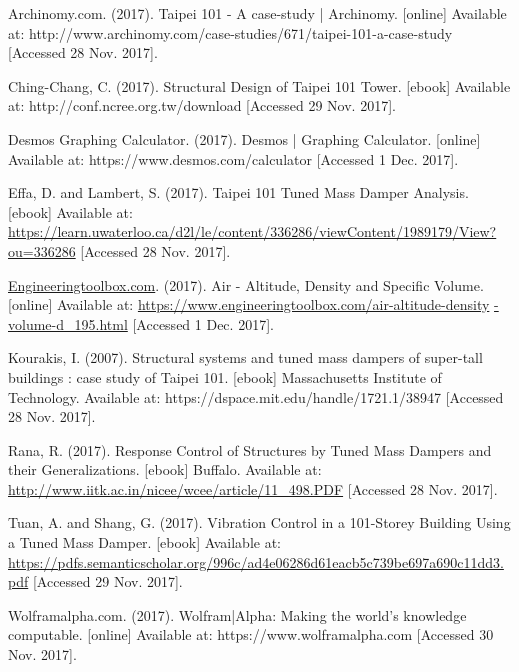 \documentclass[12pt,twoside,letterpaper]{article}
\begin{document}
\begin{list}{}{%
\setlength{\topsep}{0pt}%
\setlength{\leftmargin}{0.3in}%
\setlength{\listparindent}{-0.3in}%
\setlength{\itemindent}{-0.3in}%
\setlength{\parsep}{\parskip}%
}%
\item[]
[1] Archinomy.com. (2017). Taipei 101 - A case-study | Archinomy. [online] Available at: http://www.archinomy.com/case-studies/671/taipei-101-a-case-study [Accessed 28 Nov. 2017].
\item[]
[2] Ching-Chang, C. (2017). Structural Design of Taipei 101 Tower. [ebook] 
Available at: http://conf.ncree.org.tw/download%
[Accessed 29 Nov. 2017].
\item[]
[3] Desmos Graphing Calculator. (2017). Desmos | Graphing Calculator. [online] Available at: https://www.desmos.com/calculator [Accessed 1 Dec. 2017].
\item[]
[4] Effa, D. and Lambert, S. (2017). Taipei 101 Tuned Mass Damper Analysis. [ebook] Available at: \url{https://learn.uwaterloo.ca/d2l/le/content/336286/viewContent/1989179/View?ou=336286} [Accessed 28 Nov. 2017].
\item[]
[5] \url{Engineeringtoolbox.com}. (2017). Air - Altitude, Density and Specific Volume. [online] Available at: \url{https://www.engineeringtoolbox.com/air-altitude-density}
\newline
\url{-volume-d_195.html} [Accessed 1 Dec. 2017].
\item[]
[6] Kourakis, I. (2007). Structural systems and tuned mass dampers of super-tall buildings : case study of Taipei 101. [ebook] Massachusetts Institute of Technology. Available at: https://dspace.mit.edu/handle/1721.1/38947 [Accessed 28 Nov. 2017].
\item[]
[7] Rana, R. (2017). Response Control of Structures by Tuned Mass Dampers and their Generalizations. [ebook] Buffalo. Available at: \url{http://www.iitk.ac.in/nicee/wcee/article/11_498.PDF} [Accessed 28 Nov. 2017].
\item[]
[8] Tuan, A. and Shang, G. (2017). Vibration Control in a 101-Storey Building Using a Tuned Mass Damper. [ebook] Available at: \url{https://pdfs.semanticscholar.org/996c/ad4e06286d61eacb5c739be697a690c11dd3.pdf} [Accessed 29 Nov. 2017].
\item[]
[9] Wolframalpha.com. (2017). Wolfram|Alpha: Making the world’s knowledge computable. [online] Available at: https://www.wolframalpha.com [Accessed 30 Nov. 2017].

\end{list}
\end{document}

